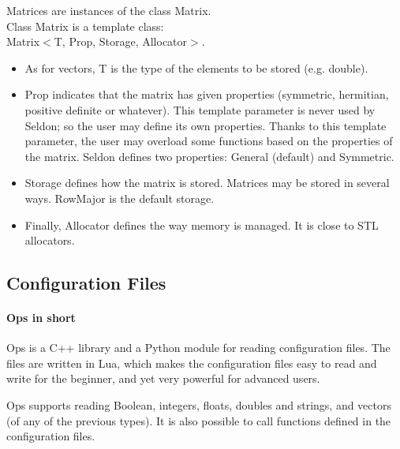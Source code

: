 \documentclass{tufte-book}
\begin{document}
\begin{itemize}
\begin{itemize}
\end{itemize}

\-Matrices are instances of the class {\ttfamily \-Matrix}.\\
\-Class {\ttfamily \-Matrix} is a template class\-:\\
 {\ttfamily \-Matrix$<$\-T, \-Prop, \-Storage, \-Allocator$>$}.

 \begin{itemize}
 \item \-As for vectors, {\ttfamily \-T} is the type of the elements to be stored (e.\-g. {\ttfamily double}).

\item {\ttfamily \-Prop} indicates that the matrix has given properties (symmetric, hermitian, positive definite or whatever). \-This template parameter is never used by \-Seldon; so the user may define its own properties. \-Thanks to this template parameter, the user may overload some functions based on the properties of the matrix. \-Seldon defines two properties\-: {\ttfamily \-General} (default) and {\ttfamily \-Symmetric}.

\item {\ttfamily \-Storage} defines how the matrix is stored. \-Matrices may be stored in several ways. {\ttfamily \-Row\-Major} is the default storage.

\item \-Finally, {\ttfamily \-Allocator} defines the way memory is managed. \-It is close to \-S\-T\-L allocators.

\end{itemize}

\hypertarget{dependencies_configuration}{}\subsection{Configuration Files}\label{dependencies_configuration}


\paragraph{Ops in short}

Ops is a C++ library and a Python module for reading configuration files. The files are written in Lua, which makes the configuration files easy to read and write for the beginner, and yet very powerful for advanced users.

Ops supports reading Boolean, integers, floats, doubles and strings, and vectors (of any of the previous types). It is also possible to call functions defined in the configuration files.


\end{itemize}
\end{document}
